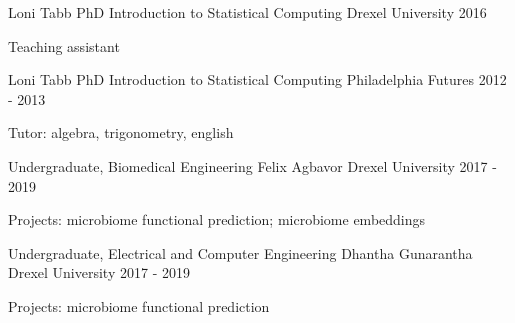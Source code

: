 \begin{cventries}
\cventry
    {Loni Tabb PhD}
    {Introduction to Statistical Computing}
    {Drexel University}
    {2016}
    {\begin{cvitems}
        \item Teaching assistant
    \end{cvitems}}
    
\cventry
    {Loni Tabb PhD}
    {Introduction to Statistical Computing}
    {Philadelphia Futures}
    {2012 - 2013}
    {\begin{cvitems}
        \item Tutor: algebra, trigonometry, english 
    \end{cvitems}}

\end{cventries}


\begin{cventries}

\cventry
    {Undergraduate, Biomedical Engineering}
    {Felix Agbavor}
    {Drexel University}
    {2017 - 2019}
    {\begin{cvitems}
        \item Projects: microbiome functional prediction; microbiome embeddings
    \end{cvitems}}

\cventry
    {Undergraduate, Electrical and Computer Engineering}
    {Dhantha Gunarantha}
    {Drexel University}
    {2017 - 2019}
    {\begin{cvitems}
        \item Projects: microbiome functional prediction
    \end{cvitems}}
    
\end{cventries}
    



